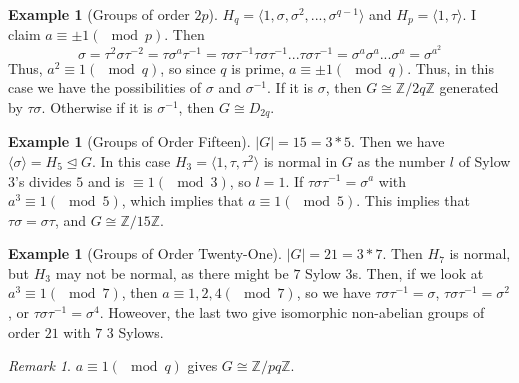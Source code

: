 \documentclass[12pt]{article}
\theoremstyle{definition}
\newtheorem{eg}[thm]{Example}
\theoremstyle{remark}
\newtheorem{rmk}[thm]{Remark}
\numberwithin{equation}{section}
\newcommand\Z{\mathbb Z}    %
\newcommand\nsub{\trianglelefteq}
\begin{document}
\vspace{15pt}

\begin{eg}[Groups of order $2p$]
        $H_q = \langle 1,\sigma,\sigma^2,...,\sigma^{q-1}\rangle$ and $H_p = \langle 1,\tau\rangle$. I claim $a \equiv \pm 1 (\mod p)$. Then \begin{equation}
                \sigma = \tau^2\sigma\tau^{-2} = \tau\sigma^a\tau^{-1} = \tau\sigma\tau^{-1}\tau\sigma\tau^{-1}...\tau\sigma\tau^{-1} = \sigma^a\sigma^a...\sigma^a = \sigma^{a^2}
        \end{equation}
        Thus, $a^2 \equiv 1 (\mod q)$, so since $q$ is prime, $a \equiv \pm 1 (\mod q)$. Thus, in this case we have the possibilities of $\sigma$ and $\sigma^{-1}$. If it is $\sigma$, then $G \cong \Z/2q\Z$ generated by $\tau\sigma$. Otherwise if it is $\sigma^{-1}$, then $G \cong D_{2q}$.
\end{eg}


\vspace{15pt}


\begin{eg}[Groups of Order Fifteen]
        $|G| = 15 = 3*5$. Then we have $\langle \sigma \rangle = H_5 \nsub G$. In this case $H_3 = \langle 1,\tau,\tau^2\rangle$ is normal in $G$ as the number $l$ of Sylow 3's divides $5$ and is $\equiv 1 (\mod 3)$, so $l =1$. If $\tau\sigma\tau^{-1} = \sigma^a$ with $a^3 \equiv 1 (\mod 5)$, which implies that $a \equiv 1 (\mod 5)$. This implies that $\tau\sigma = \sigma\tau$, and $G\cong \Z/15\Z$. 
\end{eg}


\vspace{15pt}

\begin{eg}[Groups of Order Twenty-One]
        $|G| = 21 = 3*7$. Then $H_7$ is normal, but $H_3$ may not be normal, as there might be $7$ Sylow 3s. Then, if we look at $a^3 \equiv 1 (\mod 7)$, then $a \equiv 1,2,4 (\mod 7)$, so we have $\tau\sigma\tau^{-1} = \sigma$, $\tau\sigma\tau^{-1} = \sigma^2$, or $\tau\sigma\tau^{-1} = \sigma^4$. Howeover, the last two give isomorphic non-abelian groups of order $21$ with $7$ 3 Sylows.
\end{eg}


\vspace{15pt}


\begin{rmk}
        $a \equiv 1 (\mod q)$ gives $G \cong \Z/pq\Z$.
\end{rmk}
\end{document}

